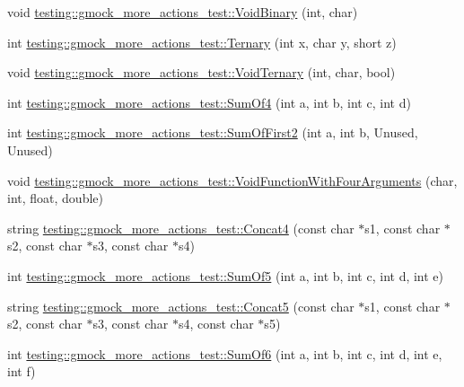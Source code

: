\begin{DoxyCompactItemize}
\item 
void \hyperlink{namespacetesting_1_1gmock__more__actions__test_aec71bd163ae67ec97e073bd13a4ac039}{testing\+::gmock\+\_\+more\+\_\+actions\+\_\+test\+::\+Void\+Binary} (int, char)
\item 
int \hyperlink{namespacetesting_1_1gmock__more__actions__test_ab98b352528a0b72625b4710a6fc648a1}{testing\+::gmock\+\_\+more\+\_\+actions\+\_\+test\+::\+Ternary} (int x, char y, short z)
\item 
void \hyperlink{namespacetesting_1_1gmock__more__actions__test_ac41b49dc8ab365ccad7b332796421cd4}{testing\+::gmock\+\_\+more\+\_\+actions\+\_\+test\+::\+Void\+Ternary} (int, char, bool)
\item 
int \hyperlink{namespacetesting_1_1gmock__more__actions__test_a41c348fff8608825239a276b8426a475}{testing\+::gmock\+\_\+more\+\_\+actions\+\_\+test\+::\+Sum\+Of4} (int a, int b, int c, int d)
\item 
int \hyperlink{namespacetesting_1_1gmock__more__actions__test_aaa60ddffb96ddc3a73b0b22929ca5bec}{testing\+::gmock\+\_\+more\+\_\+actions\+\_\+test\+::\+Sum\+Of\+First2} (int a, int b, Unused, Unused)
\item 
void \hyperlink{namespacetesting_1_1gmock__more__actions__test_a8c952be61635486e84c1eca3bf3acd9b}{testing\+::gmock\+\_\+more\+\_\+actions\+\_\+test\+::\+Void\+Function\+With\+Four\+Arguments} (char, int, float, double)
\item 
string \hyperlink{namespacetesting_1_1gmock__more__actions__test_aa423cedcbd858249b616f0c537a1e4cf}{testing\+::gmock\+\_\+more\+\_\+actions\+\_\+test\+::\+Concat4} (const char $\ast$s1, const char $\ast$s2, const char $\ast$s3, const char $\ast$s4)
\item 
int \hyperlink{namespacetesting_1_1gmock__more__actions__test_a38e64569bf08e83c6db22c1fb0fe0af6}{testing\+::gmock\+\_\+more\+\_\+actions\+\_\+test\+::\+Sum\+Of5} (int a, int b, int c, int d, int e)
\item 
string \hyperlink{namespacetesting_1_1gmock__more__actions__test_a2ac9917d1aa19cd7ac32bba837f4eacc}{testing\+::gmock\+\_\+more\+\_\+actions\+\_\+test\+::\+Concat5} (const char $\ast$s1, const char $\ast$s2, const char $\ast$s3, const char $\ast$s4, const char $\ast$s5)
\item 
int \hyperlink{namespacetesting_1_1gmock__more__actions__test_a139632d344348fdfa25111d4e43f70ba}{testing\+::gmock\+\_\+more\+\_\+actions\+\_\+test\+::\+Sum\+Of6} (int a, int b, int c, int d, int e, int f)
\item 

\end{DoxyCompactItemize}
